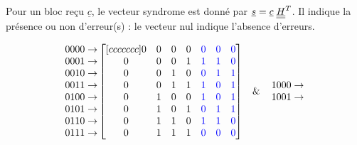 \documentclass [a4paper, 11pt] {article}
\begin{document}
    Pour un bloc reçu $\underline{c}$, le vecteur syndrome est donné par $\underline{s} = \underline{c} \; \underline{\underline{H}}^T$.  Il indique la présence ou non d'erreur(s) :  le vecteur nul indique l'absence d'erreurs.
    
    \begin{figure}[H]
        \centering
        \begin{equation*}
            \begin{matrix}
               0000 \rightarrow \\
               0001 \rightarrow \\
               0010 \rightarrow \\
               0011 \rightarrow \\
               0100 \rightarrow \\
               0101 \rightarrow \\
               0110 \rightarrow \\
               0111 \rightarrow \\
            \end{matrix}
            \begin{bmatrix}[ccccccc]
               0 & 0 & 0 & 0 & \color{blue} 0 & \color{blue} 0 & \color{blue} 0 \\
               0 & 0 & 0 & 1 & \color{blue} 1 & \color{blue} 1 & \color{blue} 0 \\
               0 & 0 & 1 & 0 & \color{blue} 0 & \color{blue} 1 & \color{blue} 1 \\
               0 & 0 & 1 & 1 & \color{blue} 1 & \color{blue} 0 & \color{blue} 1 \\
               0 & 1 & 0 & 0 & \color{blue} 1 & \color{blue} 0 & \color{blue} 1 \\
               0 & 1 & 0 & 1 & \color{blue} 0 & \color{blue} 1 & \color{blue} 1 \\
               0 & 1 & 1 & 0 & \color{blue} 1 & \color{blue} 1 & \color{blue} 0 \\
               0 & 1 & 1 & 1 & \color{blue} 0 & \color{blue} 0 & \color{blue} 0 \\
            \end{bmatrix}
            \hspace{.3cm}\&\hspace{.4cm}
            \begin{matrix}
               1000 \rightarrow \\
               1001 \rightarrow \\

\end{matrix}
\end{equation*}
\end{figure}
\end{document}
